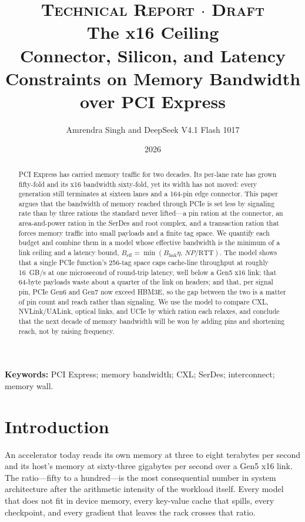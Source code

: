 \documentclass[10pt,letterpaper]{article}
\begin{document}
\title{\textsc{\small Technical Report $\cdot$ Draft}\\[10pt]
\textbf{The x16 Ceiling}\\[5pt]
{\large Connector, Silicon, and Latency Constraints on Memory Bandwidth over PCI Express}}
\author{\normalsize Amrendra Singh and DeepSeek V4.1 Flash 1017}
\date{\normalsize 2026}
\maketitle
\vspace{-1.4em}

\begin{abstract}
\noindent PCI Express has carried memory traffic for two decades. Its per-lane rate has grown fifty-fold and its x16 bandwidth sixty-fold, yet its width has not moved: every generation still terminates at sixteen lanes and a 164-pin edge connector. This paper argues that the bandwidth of memory reached through PCIe is set less by signaling rate than by three rations the standard never lifted---a pin ration at the connector, an area-and-power ration in the SerDes and root complex, and a transaction ration that forces memory traffic into small payloads and a finite tag space. We quantify each budget and combine them in a model whose effective bandwidth is the minimum of a link ceiling and a latency bound, $B_{\mathrm{eff}} = \min(B_{\mathrm{link}}\eta,\, NP/\mathrm{RTT})$. The model shows that a single PCIe function's 256-tag space caps cache-line throughput at roughly 16~GB/s at one microsecond of round-trip latency, well below a Gen5 x16 link; that 64-byte payloads waste about a quarter of the link on headers; and that, per signal pin, PCIe Gen6 and Gen7 now exceed HBM3E, so the gap between the two is a matter of pin count and reach rather than signaling. We use the model to compare CXL, NVLink/UALink, optical links, and UCIe by which ration each relaxes, and conclude that the next decade of memory bandwidth will be won by adding pins and shortening reach, not by raising frequency.
\end{abstract}

\noindent\textbf{Keywords:} PCI Express; memory bandwidth; CXL; SerDes; interconnect; memory wall.

\section{Introduction}

An accelerator today reads its own memory at three to eight terabytes per second and its host's memory at sixty-three gigabytes per second over a Gen5 x16 link. The ratio---fifty to a hundred---is the most consequential number in system architecture after the arithmetic intensity of the workload itself. Every model that does not fit in device memory, every key-value cache that spills, every checkpoint, and every gradient that leaves the rack crosses that ratio.
\end{document}
